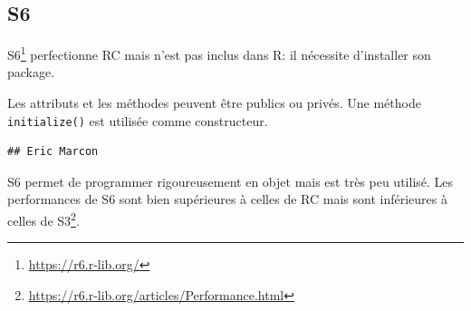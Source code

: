 \documentclass[
  12pt,
  french,
  a4paper,
  extrafontsizes,onecolumn,openright
  ]{memoir}
\newenvironment{Shaded}{\begin{snugshade}}{\end{snugshade}}
\newcommand{\AttributeTok}[1]{\textcolor[rgb]{0.13,0.29,0.53}{#1}}
\newcommand{\ConstantTok}[1]{\textcolor[rgb]{0.56,0.35,0.01}{#1}}
\newcommand{\ControlFlowTok}[1]{\textcolor[rgb]{0.13,0.29,0.53}{\textbf{#1}}}
\newcommand{\FunctionTok}[1]{\textcolor[rgb]{0.13,0.29,0.53}{\textbf{#1}}}
\newcommand{\NormalTok}[1]{#1}
\newcommand{\OtherTok}[1]{\textcolor[rgb]{0.56,0.35,0.01}{#1}}
\newcommand{\SpecialCharTok}[1]{\textcolor[rgb]{0.81,0.36,0.00}{\textbf{#1}}}
\newcommand{\StringTok}[1]{\textcolor[rgb]{0.31,0.60,0.02}{#1}}
\newlength{\rf}
\begin{document}
\subsection{S6}\label{s6}

S6\footnote{\url{https://r6.r-lib.org/}} perfectionne RC mais n'est pas inclus dans R: il nécessite d'installer son package.

Les attributs et les méthodes peuvent être publics ou privés.
Une méthode \texttt{initialize()} est utilisée comme constructeur.

\scriptsize

\begin{Shaded}
\end{Shaded}

\begin{verbatim}
## Eric Marcon
\end{verbatim}

\normalsize

S6 permet de programmer rigoureusement en objet mais est très peu utilisé.
Les performances de S6 sont bien supérieures à celles de RC mais sont inférieures à celles de S3\footnote{\url{https://r6.r-lib.org/articles/Performance.html}}.
\end{document}
